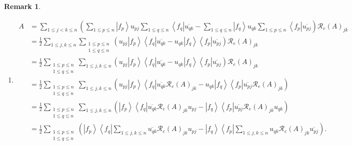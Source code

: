 \documentclass[aps,preprint]{revtex4}%
\newtheorem{remark}[theorem]{Remark}
\begin{document}
\begin{remark}
\begin{enumerate}
\item
\begin{align}
A  &  =\sum_{1\leq j<k\leq n}\left(  \sum_{1\leq p\leq n}\left\vert
f_{p}\right\rangle u_{pj}\sum_{1\leq q\leq n}\left\langle f_{q}\right\vert
\overline{u_{qk}}-\sum_{1\leq q\leq n}\left\vert f_{q}\right\rangle u_{qk}%
\sum_{1\leq p\leq n}\left\langle f_{p}\right\vert \overline{u_{pj}}\right)
\mathcal{R}_{e}\left(  A\right)  _{jk}\\
&  =\frac{1}{2}\sum_{1\leq j,k\leq n}\sum_{\substack{1\leq p\leq n\\1\leq
q\leq n}}\left(  u_{pj}\left\vert f_{p}\right\rangle \left\langle
f_{q}\right\vert \overline{u_{qk}}-u_{qk}\left\vert f_{q}\right\rangle
\left\langle f_{p}\right\vert \overline{u_{pj}}\right)  \mathcal{R}_{e}\left(
A\right)  _{jk}\\
&  =\frac{1}{2}\sum_{\substack{1\leq p\leq n\\1\leq q\leq n}}\sum_{1\leq
j,k\leq n}\left(  u_{pj}\left\vert f_{p}\right\rangle \left\langle
f_{q}\right\vert \overline{u_{qk}}-u_{qk}\left\vert f_{q}\right\rangle
\left\langle f_{p}\right\vert \overline{u_{pj}}\right)  \mathcal{R}_{e}\left(
A\right)  _{jk}\\
&  =\frac{1}{2}\sum_{\substack{1\leq p\leq n\\1\leq q\leq n}}\sum_{1\leq
j,k\leq n}\left(  u_{pj}\left\vert f_{p}\right\rangle \left\langle
f_{q}\right\vert \overline{u_{qk}}\mathcal{R}_{e}\left(  A\right)
_{jk}-u_{qk}\left\vert f_{q}\right\rangle \left\langle f_{p}\right\vert
\overline{u_{pj}}\mathcal{R}_{e}\left(  A\right)  _{jk}\right) \\
&  =\frac{1}{2}\sum_{\substack{1\leq p\leq n\\1\leq q\leq n}}\sum_{1\leq
j,k\leq n}\left(  \left\vert f_{p}\right\rangle \left\langle f_{q}\right\vert
\overline{u_{qk}}\mathcal{R}_{e}\left(  A\right)  _{jk}u_{pj}-\left\vert
f_{q}\right\rangle \left\langle f_{p}\right\vert \overline{u_{pj}}%
\mathcal{R}_{e}\left(  A\right)  _{jk}u_{qk}\right) \\
&  =\frac{1}{2}\sum_{\substack{1\leq p\leq n\\1\leq q\leq n}}\left(
\left\vert f_{p}\right\rangle \left\langle f_{q}\right\vert \sum_{1\leq
j,k\leq n}\overline{u_{qk}}\mathcal{R}_{e}\left(  A\right)  _{jk}%
u_{pj}-\left\vert f_{q}\right\rangle \left\langle f_{p}\right\vert \sum_{1\leq
j,k\leq n}u_{qk}\mathcal{R}_{e}\left(  A\right)  _{jk}\overline{u_{pj}%
}\right)  .
\end{align}

\end{enumerate}
\end{remark}
\end{document}
